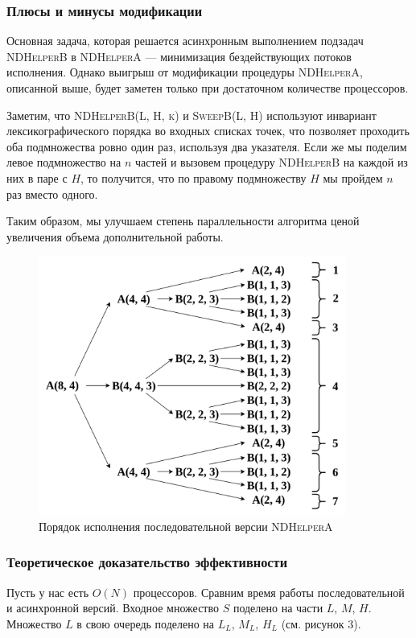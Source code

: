 \subsubsection{Плюсы и минусы модификации}
Основная задача, которая решается асинхронным выполнением подзадач \textsc{NDHelperB} в \textsc{NDHelperA} --- минимизация бездействующих потоков исполнения.
Однако выигрыш от модификации процедуры \textsc{NDHelperA}, описанной выше, будет заметен только при достаточном количестве процессоров.

Заметим, что \textsc{NDHelperB(L, H, k)} и \textsc{SweepB(L, H)} используют инвариант лексикографического порядка во входных списках точек, что позволяет проходить оба подмножества ровно один раз, используя два указателя.
Если же мы поделим левое подмножество на $n$ частей и вызовем процедуру \textsc{NDHelperB} на каждой из них в паре с $H$, то получится, что по правому подмножеству $H$ мы пройдем $n$ раз вместо одного.

Таким образом, мы улучшаем степень параллельности алгоритма ценой увеличения объема дополнительной работы.

\begin{figure}[h]
\centering
\includegraphics[width=0.9\textwidth]{images/sequential.png}
    \caption{Порядок исполнения последовательной версии \textsc{NDHelperA}}
\end{figure}

\subsubsection{Теоретическое доказательство эффективности}
Пусть у нас есть $O(N)$ процессоров. Сравним время работы последовательной и асинхронной версий.
Входное множество $S$ поделено на части $L$, $M$, $H$. Множество $L$ в свою очередь поделено на $L_L$, $M_L$, $H_L$ (см. рисунок 3).

